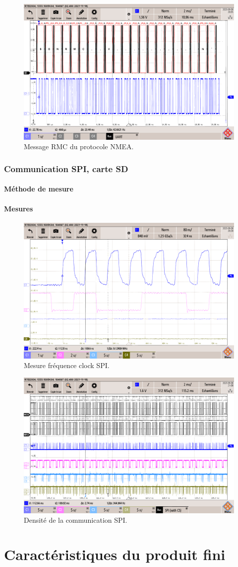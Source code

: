 \begin{figure}[!h]
	\centering
	\includegraphics[width=0.7\linewidth]{../figures/mesures/UART/message-NMEA-RMC}
	\caption{Message RMC du protocole NMEA.}
	\label{fig:message-nmea-rmc}
\end{figure}


\subsubsection{Communication SPI, carte SD} \label{ssec:Comm-SPI}
\paragraph{Méthode de mesure}
\paragraph{Mesures}

\begin{figure}[!h]
	\centering
	\includegraphics[width=0.7\linewidth]{../figures/mesures/SPI/freq-spi}
	\caption{Mesure fréquence clock SPI.}
	\label{fig:freq-spi}
\end{figure}

\begin{figure}[h]
	\centering
	\includegraphics[width=0.7\linewidth]{../figures/mesures/SPI/densite-comm}
	\caption{Densité de la communication SPI.}
	\label{fig:densite-comm}
\end{figure}



\section{Caractéristiques du produit fini} \label{sec:Carac-finis}